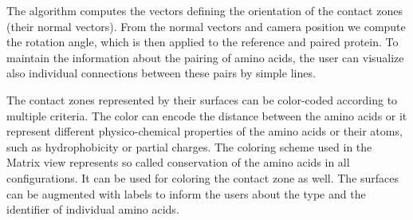 \documentclass{bmcart}
\def\ExpView {Exploded view\xspace}
\def\MatView {Matrix view\xspace}
\begin{document}
The algorithm computes the vectors defining the orientation of the contact zones (their normal vectors). 
From the normal vectors and camera position we compute the rotation angle, which is then applied to the reference and paired protein.
To maintain the information about the pairing of amino acids, the user can visualize also individual connections between these pairs by simple lines.


The contact zones represented by their surfaces can be color-coded according to multiple criteria.
The color can encode the distance between the amino acids or it represent different physico-chemical properties of the amino acids or their atoms, such as hydrophobicity or partial charges.
The coloring scheme used in the \MatView represents so called conservation of the amino acids in all configurations.
It can be used for coloring the contact zone as well.
The surfaces can be augmented with labels to inform the users about the type and the identifier of individual amino acids.
\end{document}
